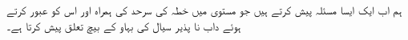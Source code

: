 ہم اب ایک ایسا مسئلہ پیش کرتے ہیں جو مستوی میں خطہ کی سرحد کی ہمراہ اور اس کو عبور کرتے ہوئے داب نا پذیر سیال کی بہاو کے بیچ تعلق پیش کرتا ہے۔ 
